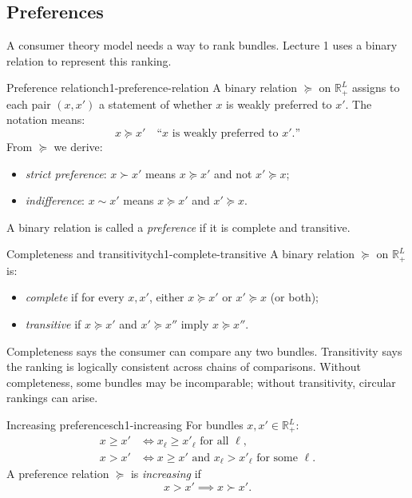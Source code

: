 \subsection{Preferences}

A consumer theory model needs a way to rank bundles. Lecture 1 uses a binary relation to represent this ranking.

\begin{definition}{Preference relation}{ch1-preference-relation}
A binary relation $\succeq$ on $\mathbb{R}^L_+$ assigns to each pair $(x,x')$ a statement of whether $x$ is weakly preferred to $x'$. The notation means:
\[
x \succeq x' \quad \text{``$x$ is weakly preferred to $x'$.''}
\]
From $\succeq$ we derive:
\begin{itemize}
    \item \emph{strict preference}: $x \succ x'$ means $x \succeq x'$ and not $x' \succeq x$;
    \item \emph{indifference}: $x \sim x'$ means $x \succeq x'$ and $x' \succeq x$.
\end{itemize}
A binary relation is called a \emph{preference} if it is complete and transitive.
\end{definition}

\begin{definition}{Completeness and transitivity}{ch1-complete-transitive}
A binary relation $\succeq$ on $\mathbb{R}^L_+$ is:
\begin{itemize}
    \item \emph{complete} if for every $x,x'$, either $x \succeq x'$ or $x' \succeq x$ (or both);
    \item \emph{transitive} if $x \succeq x'$ and $x' \succeq x''$ imply $x \succeq x''$.
\end{itemize}
\end{definition}

Completeness says the consumer can compare any two bundles. Transitivity says the ranking is logically consistent across chains of comparisons. Without completeness, some bundles may be incomparable; without transitivity, circular rankings can arise.

\begin{definition}{Increasing preferences}{ch1-increasing}
For bundles $x,x' \in \mathbb{R}^L_+$:
\begin{align*}
x \ge x' &\iff x_\ell \ge x'_\ell \text{ for all } \ell, \\
x > x' &\iff x \ge x' \text{ and } x_\ell > x'_\ell \text{ for some } \ell.
\end{align*}
A preference relation $\succeq$ is \emph{increasing} if
\[
x > x' \implies x \succ x'.
\]
\end{definition}

